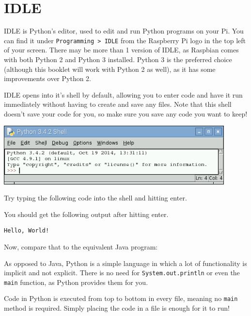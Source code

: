 \section{IDLE}

	IDLE is Python's editor, used to edit and run Python programs on your Pi. You can find it under \texttt{Programming > IDLE} from the Raspberry Pi logo in the top left of your screen. There may be more than 1 version of IDLE, as Raspbian comes with both Python 2 and Python 3 installed. Python 3 is the preferred choice (although this booklet will work with Python 2 as well), as it has some improvements over Python 2.

	IDLE opens into it's shell by default, allowing you to enter code and have it run immediately without having to create and save any files. Note that this shell doesn't save your code for you, so make sure you save any code you want to keep!

	\begin{center}
		\includegraphics[width=120mm]{McrRaspJam/014_Python/1_idle/screenshot}
	\end{center}

	Try typing the following code into the shell and hitting enter.

	

	You should get the following output after hitting enter.

	\begin{lstlisting}[style=Terminal, numbers=none]
Hello, World!
	\end{lstlisting}

	Now, compare that to the equivalent Java program:

	

	As opposed to Java, Python is a simple language in which a lot of functionality is implicit and not explicit. There is no need for \texttt{System.out.println} or even the \texttt{main} function, as Python provides them for you.

	\begin{aside}[Execution]
		Code in Python is executed from top to bottom in every file, meaning no \texttt{main} method is required. Simply placing the code in a file is enough for it to run!
	\end{aside}
